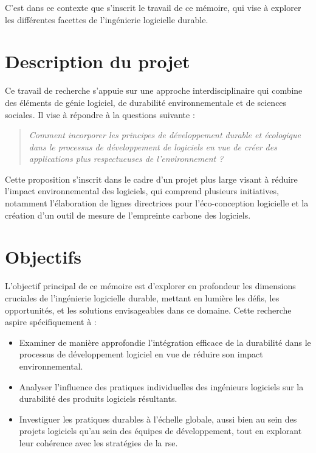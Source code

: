 C'est dans ce contexte que s'inscrit le travail de ce mémoire, qui vise à explorer les différentes facettes de l'ingénierie logicielle durable.


\section{Description du projet}
\label{sec:Ch0.2}
Ce travail de recherche s'appuie sur une approche interdisciplinaire qui combine des éléments de génie logiciel, de durabilité environnementale et de sciences sociales. 
Il vise à répondre à la questions suivante :
\begin{quote}
    
    \textit{Comment incorporer les principes de développement durable et écologique dans le processus de développement de logiciels en vue de créer des applications plus respectueuses de l'environnement ?}
    
\end{quote}

Cette proposition s'inscrit dans le cadre d'un projet plus large visant à réduire l'impact environnemental des logiciels, qui comprend plusieurs initiatives, notamment l'élaboration de lignes directrices pour l'éco-conception logicielle et la création d'un outil de mesure de l'empreinte carbone des logiciels.


\section{Objectifs}
\label{sub:Ch0.3}
L'objectif principal de ce mémoire est d'explorer en profondeur les dimensions cruciales de l'ingénierie logicielle durable, mettant en lumière les défis, les opportunités, et les solutions envisageables dans ce domaine. Cette recherche aspire spécifiquement à :
\begin{itemize}
     \item Examiner de manière approfondie l'intégration efficace de la durabilité dans le processus de développement logiciel en vue de réduire son impact environnemental.
     \item Analyser l'influence des pratiques individuelles des ingénieurs logiciels sur la durabilité des produits logiciels résultants.
     \item Investiguer les pratiques durables à l'échelle globale, aussi bien au sein des projets logiciels qu'au sein des équipes de développement, tout en explorant leur cohérence avec les stratégies de la \acrfull{rse}.
\end{itemize}

